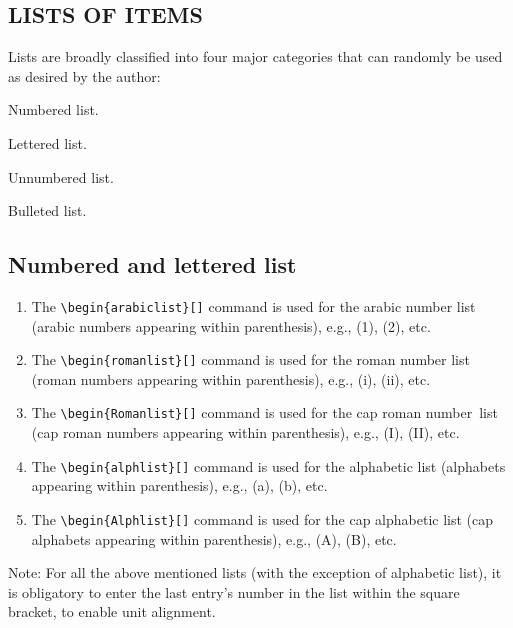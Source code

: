 \documentclass{ws-bme}
\begin{document}
\begin{multicols}{2}
\section*{LISTS OF ITEMS}
Lists are broadly classified into four major categories that can
randomly be used as desired by the author:
\begin{alphlist}[(d)]
\item Numbered list.
\item Lettered list.
\item Unnumbered list.
\item Bulleted list.
\end{alphlist}

\subsection*{Numbered and lettered list}

\begin{enumerate}
\item[] The \verb|\begin{arabiclist}[]| command is used for the arabic
number list (arabic numbers appearing within parenthesis), e.g., (1),
(2), etc.

\smallskip

\item[] The \verb|\begin{romanlist}[]| command is used for the roman
number list (roman numbers appearing within parenthesis), e.g., (i),
(ii), etc.

\smallskip

\item[] The \verb|\begin{Romanlist}[]| command is used for the cap roman
\hbox{number list} (cap roman numbers appearing within parenthesis),
e.g., (I), (II), etc.

\smallskip

\item[] The \verb|\begin{alphlist}[]| command is used for the alphabetic
list (alphabets appearing within parenthesis), e.g., (a), (b), etc.

\smallskip

\item[] The \verb|\begin{Alphlist}[]| command is used for the cap
alphabetic list (cap alphabets appearing within parenthesis), e.g.,
(A), (B), etc.
\end{enumerate}
Note: For all the above mentioned lists (with the exception of
alphabetic list), it is obligatory to enter the last entry's number
in the list within the square bracket, to enable unit alignment.


\end{multicols}
\end{document}
